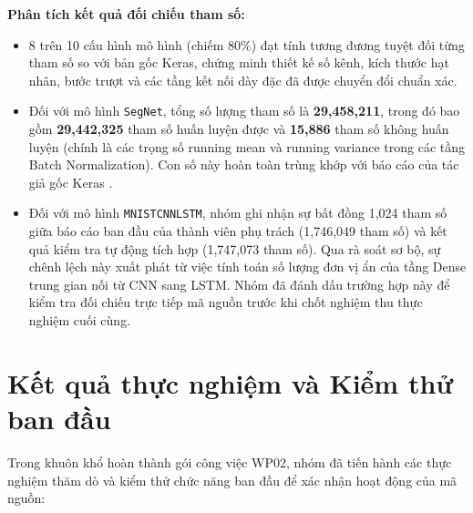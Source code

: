 \textbf{Phân tích kết quả đối chiếu tham số:}
\begin{itemize}
\item 8 trên 10 cấu hình mô hình (chiếm 80\%) đạt tính tương đương tuyệt đối từng tham số so với bản gốc Keras, chứng minh thiết kế số kênh, kích thước hạt nhân, bước trượt và các tầng kết nối dày đặc đã được chuyển đổi chuẩn xác.
\item Đối với mô hình \texttt{SegNet}, tổng số lượng tham số là \textbf{29,458,211}, trong đó bao gồm \textbf{29,442,325} tham số huấn luyện được và \textbf{15,886} tham số không huấn luyện (chính là các trọng số running mean và running variance trong các tầng Batch Normalization). Con số này hoàn toàn trùng khớp với báo cáo của tác giả gốc Keras \cite{badrinarayanan2017segnet}.
\item Đối với mô hình \texttt{MNISTCNNLSTM}, nhóm ghi nhận sự bất đồng 1,024 tham số giữa báo cáo ban đầu của thành viên phụ trách (1,746,049 tham số) và kết quả kiểm tra tự động tích hợp (1,747,073 tham số). Qua rà soát sơ bộ, sự chênh lệch này xuất phát từ việc tính toán số lượng đơn vị ẩn của tầng Dense trung gian nối từ CNN sang LSTM. Nhóm đã đánh dấu trường hợp này để kiểm tra đối chiếu trực tiếp mã nguồn trước khi chốt nghiệm thu thực nghiệm cuối cùng.
\end{itemize}

\section{Kết quả thực nghiệm và Kiểm thử ban đầu}
Trong khuôn khổ hoàn thành gói công việc WP02, nhóm đã tiến hành các thực nghiệm thăm dò và kiểm thử chức năng ban đầu để xác nhận hoạt động của mã nguồn:

